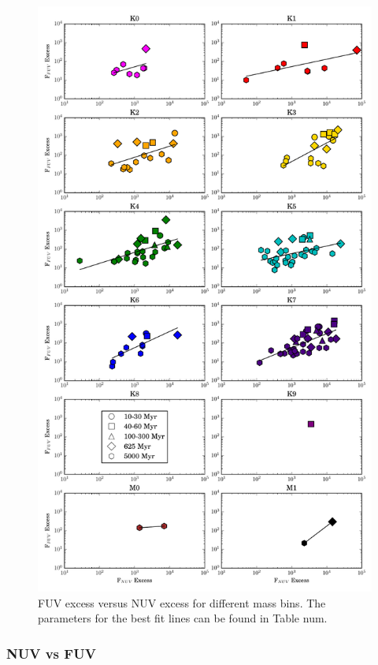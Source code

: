 \documentclass[twocolumn]{aastex62}
\begin{document}
\begin{figure}[t]
\centering
\includegraphics[width=\linewidth]{nuv_vs_fuv_10_NO_J_Kspt.pdf}
\caption{FUV excess versus NUV excess for different mass bins. The parameters for the best fit lines can be found in Table num. \label{fig:nuv_vs_fuv}}
\end{figure}



\subsubsection{NUV vs FUV}
\end{document}
